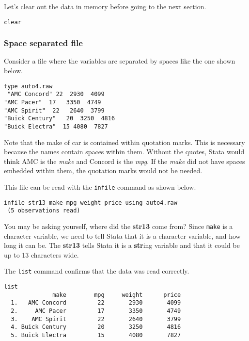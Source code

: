 Let's clear out the data in memory before going to the next section.

\begin{lstlisting}
clear
\end{lstlisting}

\subsubsection{Space separated file}

Consider a file where the variables are separated by spaces like the one shown below.

\begin{lstlisting}
type auto4.raw
 "AMC Concord" 22  2930  4099
"AMC Pacer"  17   3350  4749
"AMC Spirit"  22   2640  3799
"Buick Century"   20  3250  4816
"Buick Electra"  15 4080  7827
\end{lstlisting}

Note that the make of car is contained within quotation marks. This is necessary because the names contain spaces within them. Without the quotes, Stata would think AMC is the \textit{make} and Concord is the \textit{mpg}. If the \textit{make} did not have spaces embedded within them, the quotation marks would not be needed.

This file can be read with the \lstinline{infile} command as shown below.

\begin{lstlisting}
infile str13 make mpg weight price using auto4.raw
 (5 observations read)
\end{lstlisting}

You may be asking yourself, where did the \textbf{str13} come from? Since \lstinline{make} is a character variable, we need to tell Stata that it is a character variable, and how long it can be. The \textbf{str13} tells Stata it is a \textbf{str}ing variable and that it could be up to 13 characters wide.

The \lstinline{list} command confirms that the data was read correctly.

\begin{lstlisting}
list
              make        mpg     weight      price
  1.   AMC Concord         22       2930       4099
  2.     AMC Pacer         17       3350       4749
  3.    AMC Spirit         22       2640       3799
  4. Buick Century         20       3250       4816
  5. Buick Electra         15       4080       7827
\end{lstlisting}

